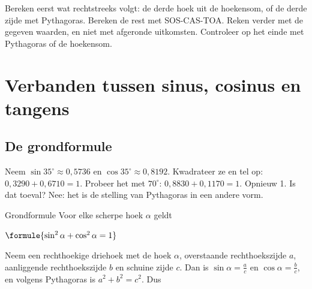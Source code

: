 \begin{werkwijze}
Bereken eerst wat rechtstreeks volgt: de derde hoek uit de hoekensom, of de derde zijde met Pythagoras. Bereken de rest met SOS-CAS-TOA. Reken verder met de gegeven waarden, en niet met afgeronde uitkomsten. Controleer op het einde met Pythagoras of de hoekensom.
\end{werkwijze}

\begin{oefeningen}
\end{oefeningen}

\section{Verbanden tussen sinus, cosinus en tangens}

\subsection{De grondformule}

Neem $\sin 35^\circ \approx 0{,}5736$ en $\cos 35^\circ \approx 0{,}8192$. Kwadrateer ze en tel op: $0{,}3290 + 0{,}6710 = 1$. Probeer het met $70^\circ$: $0{,}8830 + 0{,}1170 = 1$. Opnieuw 1. Is dat toeval? Nee: het is de stelling van Pythagoras in een andere vorm.

\begin{theorie}
\begin{minipage}[t]{.64\linewidth}
\vspace{0pt}
\begin{stelling}{Grondformule}
Voor elke scherpe hoek $\alpha$ geldt

\vspace{1mm}
\qquad $\formule{\sin^2\alpha + \cos^2\alpha = 1}$
\end{stelling}

\begin{bewijs}
Neem een rechthoekige driehoek met de hoek $\alpha$, overstaande rechthoekszijde $a$, aanliggende rechthoekszijde $b$ en schuine zijde $c$. Dan is $\sin\alpha = \tfrac{a}{c}$ en $\cos\alpha = \tfrac{b}{c}$, en volgens Pythagoras is $a^2 + b^2 = c^2$. Dus
\end{bewijs}
\end{minipage}\hfill
\begin{minipage}[t]{.32\linewidth}
\vspace{4mm}
\centering
{}
\end{minipage}
\end{theorie}

